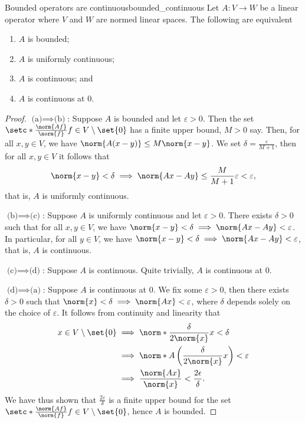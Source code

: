 \begin{theorem}{Bounded operators are continuous}{bounded_continuous}
    Let \(A : V \to W\) be a linear operator where \(V\) and \(W\) are normed linear spaces. The following are equivalent
    \begin{enumerate}[label=(\alph*)]
        \item \(A\) is bounded;
        \item \(A\) is uniformly continuous;
        \item \(A\) is continuous; and
        \item \(A\) is continuous at \(0\).
    \end{enumerate}
\end{theorem}
\begin{proof}
    \(\text{(a)}\implies\text{(b)}\): Suppose \(A\) is bounded and let \(\varepsilon > 0\). Then the set \(\setc*{\frac{\norm{Af}}{\norm{f}}}{f \in V \setminus\set{0}}\) has a finite upper bound, \(M > 0\) say. Then, for all \(x,y \in V\), we have \(\norm{A(x - y)} \leq M \norm{x-y}\). We set \(\delta = \frac{\varepsilon}{M + 1}\), then for all \(x, y \in V\) it follows that
    \begin{equation*}
        \norm{x - y} < \delta \implies \norm{Ax - Ay} \leq \frac{M}{M+1} \varepsilon < \varepsilon,
    \end{equation*}
    that is, \(A\) is uniformly continuous.

    \(\text{(b)}\implies\text{(c)}\): Suppose \(A\) is uniformly continuous and let \(\varepsilon > 0\). There exists \(\delta > 0\) such that for all \(x,y \in V\), we have \(\norm{x - y} < \delta \implies \norm{Ax - Ay} < \varepsilon\). In particular, for all \(y \in V\), we have \(\norm{x - y} < \delta \implies \norm{Ax - Ay} < \varepsilon\), that is, \(A\) is continuous.

    \(\text{(c)}\implies\text{(d)}\): Suppose \(A\) is continuous. Quite trivially, \(A\) is continuous at \(0\).

    \(\text{(d)}\implies\text{(a)}\): Suppose \(A\) is continuous at \(0\). We fix some \(\varepsilon > 0\), then there exists \(\delta > 0\) such that \(\norm{x} < \delta \implies \norm{Ax} < \varepsilon\), where \(\delta\) depends solely on the choice of \(\varepsilon\). It follows from continuity and linearity that
    \begin{align*}
        x \in V \setminus\set{0}&\implies\norm*{\frac{\delta}{2\norm{x}}x} < \delta\\
                                     &\implies\norm*{A\left(\frac{\delta}{2\norm{x}}x\right)} < \varepsilon\\
                                     &\implies \frac{\norm{Ax}}{\norm{x}} < \frac{2 \epsilon}{\delta}.
    \end{align*}
    We have thus shown that \(\frac{2 \varepsilon}{\delta}\) is a finite upper bound for the set \(\setc*{\frac{\norm{Af}}{\norm{f}}}{f \in V \setminus\set{0}}\), hence \(A\) is bounded.
\end{proof}

